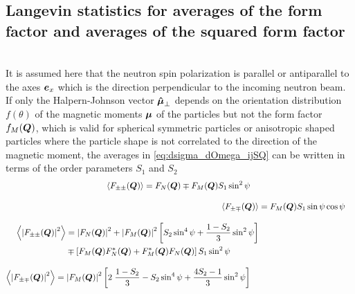 \subsection{Langevin statistics for averages of the form factor and averages of the squared form factor}
~\\

 It is assumed here that the neutron spin polarization is
parallel or antiparallel to the axes $\mbox{\boldmath$e$}_x$ which is the
direction perpendicular to the incoming neutron beam. If only the
Halpern-Johnson vector $\mbox{\boldmath$\hat{\mu}$}_\perp$ depends on the
orientation distribution $f(\theta)$ of the magnetic moments
$\mbox{\boldmath$\mu$}$ of the particles but not the form factor $f_M(\mbox{\boldmath$Q$})$,
which is valid for spherical symmetric particles or anisotropic
shaped particles where the particle shape is not correlated to the
direction of the magnetic moment, the averages in
\ref{eq:dsigma_dOmega_ijSQ} can be written in terms of the order
parameters $S_1$ and $S_2$
\begin{subequations}
\label{eq:plugin:F_ijSQ}
\begin{align}
\begin{split}
\left\langle F_{\pm\pm}(\mbox{\boldmath$Q$})\right\rangle &=  F_N(\mbox{\boldmath$Q$})
\mp F_M(\mbox{\boldmath$Q$})S_1\sin^2\psi
\end{split} \\[3mm]
\left\langle F_{\pm\mp}(\mbox{\boldmath$Q$})\right\rangle &= F_M(\mbox{\boldmath$Q$})S_1\sin\psi\cos\psi  \\[3mm]
\begin{split}
\left\langle {\left\vert F_{\pm\pm}(\mbox{\boldmath$Q$})\right\vert}^2\right\rangle &= {\left\vert F_N(\mbox{\boldmath$Q$})\right\vert}^2+{\left\vert F_M(\mbox{\boldmath$Q$})\right\vert}^2 \left[S_2 \sin^4\psi+ \frac{1-S_2}{3} \sin^2\psi\right] \\
                                       & \mp \left[F_M(\mbox{\boldmath$Q$})F^*_N(\mbox{\boldmath$Q$})+F^*_M(\mbox{\boldmath$Q$})F_N(\mbox{\boldmath$Q$})\right]S_1\sin^2\psi
\end{split} \\[3mm]
\begin{split}
\left\langle {\left\vert F_{\pm\mp}(\mbox{\boldmath$Q$})\right\vert}^2\right\rangle
&={\left\vert F_M(\mbox{\boldmath$Q$})\right\vert}^2
\left[2\;\frac{1-S_2}{3}-S_2\sin^4\psi+\frac{4S_2-1}{3}\sin^2\psi\right]
\end{split}
\end{align}
\end{subequations}

